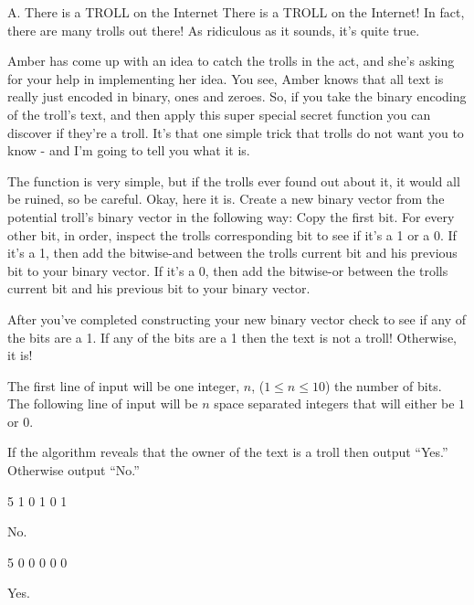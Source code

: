 \begin{problem}{A. There is a TROLL on the Internet}
There is a TROLL on the Internet!
In fact, there are many trolls out there!
As ridiculous as it sounds, it's quite true.

Amber has come up with an idea to catch the trolls in the act, and she's asking for your help in implementing her idea.
You see, Amber knows that all text is really just encoded in binary, ones and zeroes.
So, if you take the binary encoding of the troll's text, and then apply this super special secret function you can discover if they're a troll.
It's that one simple trick that trolls do not want you to know - and I'm going to tell you what it is.

The function is very simple, but if the trolls ever found out about it, it would all be ruined, so be careful.
Okay, here it is.
Create a new binary vector from the potential troll's binary vector in the following way:
Copy the first bit.
For every other bit, in order, inspect the trolls corresponding bit to see if it's a 1 or a 0.
If it's a 1, then add the bitwise-and between the trolls current bit and his previous bit to your binary vector.
If it's a 0, then add the bitwise-or between the trolls current bit and his previous bit to your binary vector.

After you've completed constructing your new binary vector check to see if any of the bits are a 1.
If any of the bits are a 1 then the text is not a troll!
Otherwise, it is!
\end{problem}

\begin{formalin}
The first line of input will be one integer, $n$, ($1 \leq n \leq 10$) the number of bits.
The following line of input will be $n$ space separated integers that will either be $1$ or $0$.
\end{formalin}

\begin{formalout}
If the algorithm reveals that the owner of the text is a troll then output ``Yes.''
Otherwise output ``No.''
\end{formalout}

\begin{datain}
5
1 0 1 0 1
\end{datain}
\begin{dataout}
No.
\end{dataout}

\begin{datain}
5
0 0 0 0 0
\end{datain}
\begin{dataout}
Yes.
\end{dataout}
